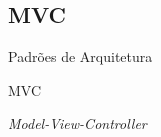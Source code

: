 \documentclass[
	10pt, %
	t, %
]{beamer}
\begin{document}

\subsection{MVC}

\begin{frame}
	\begin{center}
		
		\bigskip\bigskip\bigskip\bigskip %
		{\Large Padrões de Arquitetura}
		
		\bigskip\bigskip %
		{\Huge MVC}
		
		\smallskip
		{\small \textit{Model-View-Controller}}
	\end{center}

\end{frame}
\end{document}

